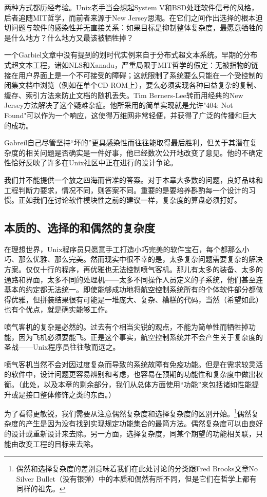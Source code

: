 \documentclass[12pt,oneside]{book}
\begin{document}
两种方式都历经考验。Unix老手当会想起System V和BSD处理软件信号的风格，后者追随MIT哲学，而前者来源于New Jersey思潮。在它们之间作出选择的根本迫切问题与软件的感染性并无直接关系：如果目标是抑制整体复杂度，最愿意牺牲的是什么地方？什么地方又最该被牺牲掉？

一个Garbiel文章中没有提到的划时代实例来自于分布式超文本系统。早期的分布式超文本工程，诸如NLS和Xanadu，严重局限于MIT哲学的假定：无被指物的链接在用户界面上是一个不可接受的障碍；这就限制了系统要么只能在一个受控制的闭集文档中浏览（例如在单个CD-ROM上），要么必须实现各种曰益复杂的复制、缓存、索引方法来防止文档的随机丢失。Tim Berners-Lee转而用经典的New Jersey方法解决了这个疑难杂症。他所采用的简单实现就是允许"404: Not Found"可以作为一个响应，这使得万维网非常轻便，并获得了广泛的传播和巨大的成功。

Gabreil自己尽管坚持“坏的”更具感染性而往往能取得最后胜利，但关于其潜在复杂度的相关问题是否确实是一件好事，他已经数次公开地改变了意见。他的不确定性恰好反映了许多在Unix社区中正在进行的设计争论。

我们并不能提供一个放之四海而皆准的答案。对于本章大多数的问题，良好品味和工程判断力要求，情况不同，则答案不同。重要的是要培养斟酌每一个设计的习惯。正如我们在讨论软件模块性之前的建议一样，复杂度的算盘必须打好。

\subsection{本质的、选择的和偶然的复杂度}
在理想世界，Unix程序员只愿意手工打造小巧完美的软件宝石，每个都那么小巧、那么优雅、那么完美。然而现实中很不幸的是，太多复杂问题需要复杂的解决方案。仅仅十行的程序，再优雅也无法控制喷气客机。那儿有太多的装备、太多的通路和界面，太多不同的处理机——太多不同操作人员定义的子系统，他们甚至连基本的约定都无法统一。即使能够成功地将航空控制系统所有的个体软件部分都做得优雅，但拼装结果很有可能是一堆庞大、复杂、糟糕的代码，当然（希望如此）也有个优点，就是确实能够工作。

喷气客机的复杂是必然的。过去有个相当尖锐的观点，不能为简单性而牺牲掉功能，因为飞机必须要能飞。正是这个事实，航空控制系统并不会产生关于复杂度的圣战——Unix程序员往往敬而远之。

喷气客机当然不会对因过度复杂而导致的系统故障有免疫功能。但是在需求较灵活的软件中，设计问题更容易辨别和考虑，也容易在预期的功能性和复杂度中做出权衡。（此处，以及本章的剩余部分，我们从总体方面使用“功能”来包括诸如性能提升或是接口整体修饰之类的东西。）

为了看得更敏锐，我们需要从注意偶然复杂度和选择复杂度的区别开始。\footnote{偶然和选择复杂度的差别意味着我们在此处讨论的分类跟Fred Brooks文章No Silver Bullet（没有银弹）\cite{Brooks}中的本质和偶然有所不同，但是它们在哲学上都有同样的祖先。}偶然复杂度的产生是因为没有找到实现规定功能集合的最简方法。偶然复杂度可以由良好的设计或重新设计来去除。另一方面，选择复杂度，同某个期望的功能相关联，只能由改变工程的目标来去除。
\end{document}

